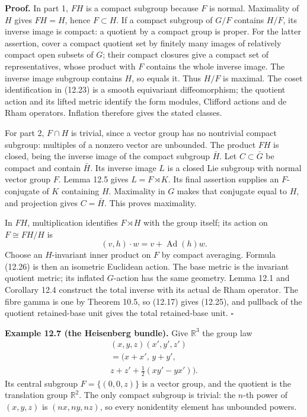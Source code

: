 \documentclass[
  11pt,
]{article}
\begin{document}
\textbf{Proof.} In part 1, \(FH\) is a compact subgroup because \(F\) is
normal. Maximality of \(H\) gives \(FH=H\), hence \(F\subset H\). If a
compact subgroup of \(G/F\) contains \(H/F\), its inverse image is
compact: a quotient by a compact group is proper. For the latter
assertion, cover a compact quotient set by finitely many images of
relatively compact open subsets of \(G\); their compact closures give a
compact set of representatives, whose product with \(F\) contains the
whole inverse image. The inverse image subgroup contains \(H\), so
equals it. Thus \(H/F\) is maximal. The coset identification in (12.23)
is a smooth equivariant diffeomorphism; the quotient action and its
lifted metric identify the form modules, Clifford actions and de Rham
operators. Inflation therefore gives the stated classes.

For part 2, \(F\cap H\) is trivial, since a vector group has no
nontrivial compact subgroup: multiples of a nonzero vector are
unbounded. The product \(FH\) is closed, being the inverse image of the
compact subgroup \(\bar H\). Let \(C\subset\bar G\) be compact and
contain \(\bar H\). Its inverse image \(L\) is a closed Lie subgroup
with normal vector group \(F\). Lemma 12.5 gives \(L=F\rtimes K\). Its
final assertion supplies an \(F\)-conjugate of \(K\) containing \(H\).
Maximality in \(G\) makes that conjugate equal to \(H\), and projection
gives \(C=\bar H\). This proves maximality.

In \(FH\), multiplication identifies \(F\rtimes H\) with the group
itself; its action on \(F\cong FH/H\) is \[
(v,h)\cdot w=v+\operatorname{Ad}(h)w.
\tag{12.26}
\] Choose an \(H\)-invariant inner product on \(F\) by compact
averaging. Formula (12.26) is then an isometric Euclidean action. The
base metric is the invariant quotient metric; its inflated \(G\)-action
has the same geometry. Lemma 12.1 and Corollary 12.4 construct the total
inverse with its actual de Rham operator. The fibre gamma is one by
Theorem 10.5, so (12.17) gives (12.25), and pullback of the quotient
retained-base unit gives the total retained-base unit. \(\square\)

\textbf{Example 12.7 (the Heisenberg bundle).} Give \(\mathbb R^3\) the
group law \[
\begin{gathered}
(x,y,z)(x',y',z')\\
=(x+x',\,y+y',\\
z+z'+\tfrac12(xy'-yx')).
\end{gathered}
\tag{12.27}
\] Its central subgroup \(F=\{(0,0,z)\}\) is a vector group, and the
quotient is the translation group \(\mathbb R^2\). The only compact
subgroup is trivial: the \(n\)-th power of \((x,y,z)\) is
\((nx,ny,nz)\), so every nonidentity element has unbounded powers.
\end{document}
